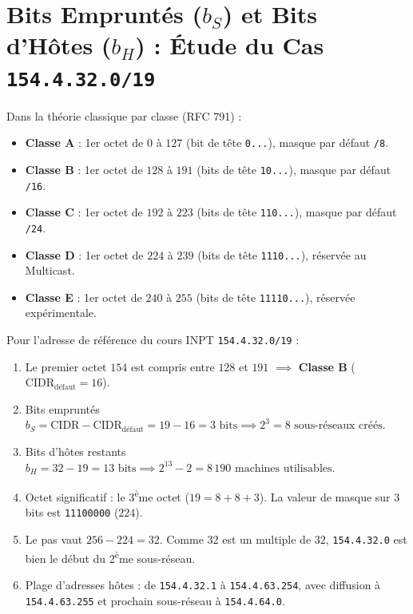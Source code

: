 \documentclass[11pt,a4paper]{report}
\begin{document}
\section[Cas d'\'Etude 154.4.32.0/19 : Bits Emprunt\'es et d'H\^otes]{Bits Emprunt\'es \texorpdfstring{($b_S$)}{(b\_S)} et Bits d'H\^otes \texorpdfstring{($b_H$)}{(b\_H)} : \'Etude du Cas \texttt{154.4.32.0/19}}
Dans la th\'eorie classique par classe (RFC 791) :
\begin{itemize}
    \item \textbf{Classe A} : 1er octet de $0$ \`a $127$ (bit de t\^ete \texttt{0...}), masque par d\'efaut \texttt{/8}.
    \item \textbf{Classe B} : 1er octet de $128$ \`a $191$ (bits de t\^ete \texttt{10...}), masque par d\'efaut \texttt{/16}.
    \item \textbf{Classe C} : 1er octet de $192$ \`a $223$ (bits de t\^ete \texttt{110...}), masque par d\'efaut \texttt{/24}.
    \item \textbf{Classe D} : 1er octet de $224$ \`a $239$ (bits de t\^ete \texttt{1110...}), r\'eserv\'ee au Multicast.
    \item \textbf{Classe E} : 1er octet de $240$ \`a $255$ (bits de t\^ete \texttt{11110...}), r\'eserv\'ee exp\'erimentale.
\end{itemize}

Pour l'adresse de r\'ef\'erence du cours INPT \texttt{154.4.32.0/19} :
\begin{enumerate}
    \item Le premier octet $154$ est compris entre $128$ et $191$ $\implies$ \textbf{Classe B} ($\text{CIDR}_{\text{d\'efaut}} = 16$).
    \item Bits emprunt\'es $b_S = \text{CIDR} - \text{CIDR}_{\text{d\'efaut}} = 19 - 16 = 3\text{ bits} \implies 2^3 = 8\text{ sous-r\'eseaux cr\'e\'es}$.
    \item Bits d'h\^otes restants $b_H = 32 - 19 = 13\text{ bits} \implies 2^{13} - 2 = 8\,190\text{ machines utilisables}$.
    \item Octet significatif : le 3\textsuperscript{\`e}me octet ($19 = 8 + 8 + 3$). La valeur de masque sur 3 bits est \texttt{11100000} ($224$).
    \item Le pas vaut $256 - 224 = 32$. Comme $32$ est un multiple de $32$, \texttt{154.4.32.0} est bien le d\'ebut du 2\textsuperscript{\`e}me sous-r\'eseau.
    \item Plage d'adresses h\^otes : de \texttt{154.4.32.1} \`a \texttt{154.4.63.254}, avec diffusion \`a \texttt{154.4.63.255} et prochain sous-r\'eseau \`a \texttt{154.4.64.0}.
\end{enumerate}
\end{document}
